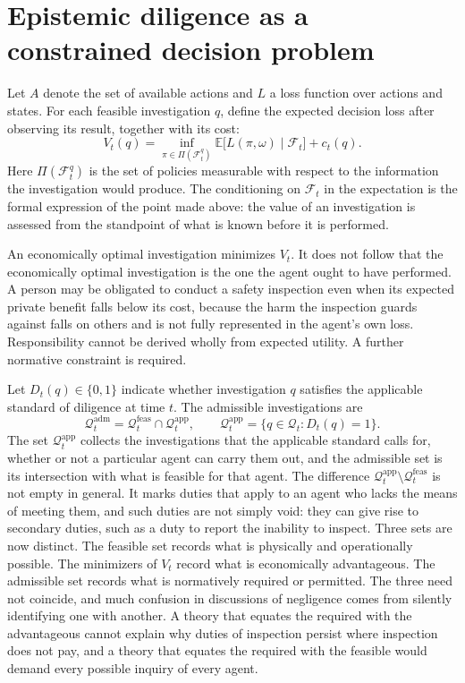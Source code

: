 \documentclass[11pt]{article}
\newcommand{\F}{\mathcal F}
\newcommand{\Q}{\mathcal Q}
\newcommand{\E}{\mathbb E}
\newcommand{\feas}{\mathrm{feas}}
\newcommand{\adm}{\mathrm{adm}}
\theoremstyle{definition}
\begin{document}
\section{Epistemic diligence as a constrained decision problem}

Let $A$ denote the set of available actions and $L$ a loss function over actions and states. For each feasible investigation $q$, define the expected decision loss after observing its result, together with its cost:
\[
V_t(q)
=
\inf_{\pi\in\Pi(\F_t^{q})}
\E\bigl[L(\pi,\omega)\mid\F_t\bigr]
+
c_t(q).
\]
Here $\Pi(\F_t^{q})$ is the set of policies measurable with respect to the information the investigation would produce. The conditioning on $\F_t$ in the expectation is the formal expression of the point made above: the value of an investigation is assessed from the standpoint of what is known before it is performed.

An economically optimal investigation minimizes $V_t$. It does not follow that the economically optimal investigation is the one the agent ought to have performed. A person may be obligated to conduct a safety inspection even when its expected private benefit falls below its cost, because the harm the inspection guards against falls on others and is not fully represented in the agent's own loss. Responsibility cannot be derived wholly from expected utility. A further normative constraint is required.

Let $D_t(q)\in\{0,1\}$ indicate whether investigation $q$ satisfies the applicable standard of diligence at time $t$. The admissible investigations are
\[
\Q_t^{\adm}
=
\Q_t^{\feas}\cap\Q_t^{\mathrm{app}},
\qquad
\Q_t^{\mathrm{app}}=\{q\in\Q_t : D_t(q)=1\}.
\]
The set $\Q_t^{\mathrm{app}}$ collects the investigations that the applicable standard calls for, whether or not a particular agent can carry them out, and the admissible set is its intersection with what is feasible for that agent. The difference $\Q_t^{\mathrm{app}}\setminus\Q_t^{\feas}$ is not empty in general. It marks duties that apply to an agent who lacks the means of meeting them, and such duties are not simply void: they can give rise to secondary duties, such as a duty to report the inability to inspect.
Three sets are now distinct. The feasible set records what is physically and operationally possible. The minimizers of $V_t$ record what is economically advantageous. The admissible set records what is normatively required or permitted. The three need not coincide, and much confusion in discussions of negligence comes from silently identifying one with another. A theory that equates the required with the advantageous cannot explain why duties of inspection persist where inspection does not pay, and a theory that equates the required with the feasible would demand every possible inquiry of every agent.
\end{document}
